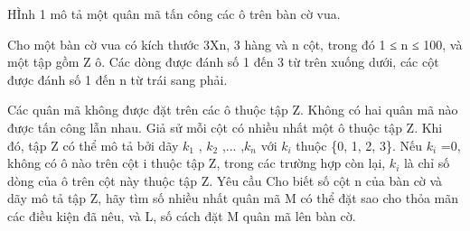 HÌnh 1 mô tả một quân mã tấn công các ô trên bàn cờ vua.  

   Cho một bàn cờ vua có kích thước 3Xn, 3 hàng và n cột, trong đó 1 ≤ n ≤ 100, và một tập gồm Z ô. Các dòng được đánh số 1 đến 3 từ   trên xuống dưới, các cột được đánh số 1 đến n từ trái sang phải.  

   Các quân mã không được đặt trên các ô thuộc tập Z. Không có hai quân mã nào được tấn công lẫn nhau. Giả sử mỗi cột có nhiều nhất một ô   thuộc tập Z. Khi đó, tập Z có thể mô tả bởi dãy $k_{1}$   , $k_{2}$   ,... ,$k_{n}$   với $k_{i}$   thuộc \{0, 1, 2, 3\}. Nếu   $k_{i}$   =0, không có ô nào trên cột i thuộc tập Z, trong các trường hợp còn lại, $k_{i}$   là chỉ số dòng của ô trên cột này thuộc   tập Z.
Yêu cầu
Cho biết số cột n của bàn cờ và dãy mô tả tập Z, hãy tìm số nhiều nhất quân mã M có thể đặt sao cho thỏa mãn các điều kiện đã nêu, và L,   số cách đặt M quân mã lên bàn cờ.